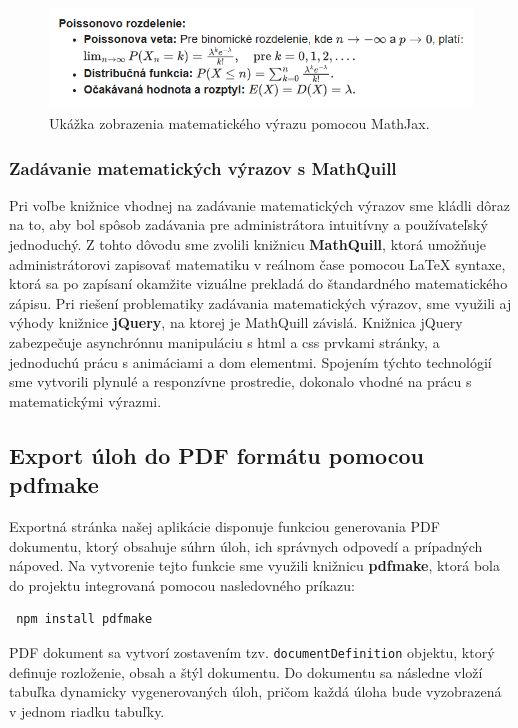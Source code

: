   \begin{figure}[H]
    \centering
    \includegraphics[width=13cm]{img/mathjax_priklad.png}
    \caption{Ukážka zobrazenia matematického výrazu pomocou MathJax.}
    \label{fig:mathjax-priklad}
  \end{figure}

  \subsubsection*{Zadávanie matematických výrazov s MathQuill}

 Pri voľbe knižnice vhodnej na zadávanie matematických výrazov sme kládli dôraz na to, aby bol spôsob zadávania pre administrátora intuitívny a používateľský jednoduchý.
 Z tohto dôvodu sme zvolili knižnicu \textbf{MathQuill}, ktorá umožňuje administrátorovi zapisovať matematiku v reálnom čase pomocou LaTeX syntaxe, ktorá sa po zapísaní okamžite vizuálne prekladá do štandardného matematického zápisu.
 Pri riešení problematiky zadávania matematických výrazov, sme využili aj výhody knižnice \textbf{jQuery}, na ktorej je MathQuill závislá.
 Knižnica jQuery zabezpečuje asynchrónnu manipuláciu s \acrshort{html} a \acrshort{css} prvkami stránky,  a jednoduchú prácu s animáciami a \acrshort{dom} elementmi.
 Spojením týchto technológií sme vytvorili plynulé a responzívne prostredie, dokonalo vhodné na prácu s matematickými výrazmi.

 \subsection{Export úloh do PDF formátu pomocou pdfmake}

 Exportná stránka našej aplikácie disponuje funkciou generovania PDF dokumentu, ktorý obsahuje súhrn úloh, ich správnych odpovedí a prípadných nápoved.
 Na vytvorenie tejto funkcie sme využili knižnicu \textbf{pdfmake}, ktorá bola do projektu integrovaná pomocou nasledovného príkazu:  
 \begin{verbatim} npm install pdfmake \end{verbatim}
 
PDF dokument sa vytvorí zostavením tzv. \texttt{documentDefinition} objektu, ktorý definuje rozloženie, obsah a štýl dokumentu.
 Do dokumentu sa následne vloží tabuľka dynamicky vygenerovaných úloh, pričom každá úloha bude vyzobrazená v jednom riadku tabuľky.
 

